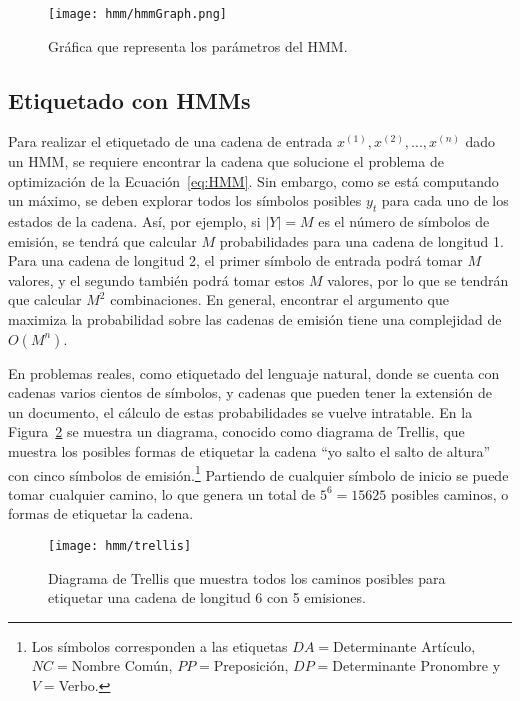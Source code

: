\begin{figure}
 \centering
 \texttt{[image: hmm/hmmGraph.png]}
 \caption{Gráfica que representa los parámetros del HMM.}\label{Fig:hmmGraph}
\end{figure}





\subsection{Etiquetado con HMMs}

Para realizar el etiquetado de una cadena de entrada $x^{(1)}, x^{(2)},...,x^{(n)}$ dado un HMM, se requiere encontrar la cadena que solucione el problema de optimización de la Ecuación~\ref{eq:HMM}. Sin embargo, como se está computando un máximo, se deben explorar todos los símbolos posibles $y_t$ para cada uno de los estados de la cadena. Así, por ejemplo, si $|Y| = M$ es el número de símbolos de emisión, se tendrá que calcular $M$ probabilidades para una cadena de longitud 1. Para una cadena de longitud 2, el primer símbolo de entrada podrá tomar $M$ valores, y el segundo también podrá tomar estos $M$ valores, por lo que se tendrán que calcular $M^2$ combinaciones. En general, encontrar el argumento que maximiza la probabilidad sobre las cadenas de emisión tiene una complejidad de $O(M^n)$.

En problemas reales, como etiquetado del lenguaje natural, donde se cuenta con cadenas varios cientos de símbolos, y cadenas que pueden tener la extensión de un documento, el cálculo de estas probabilidades se vuelve intratable. En la Figura~\ref{Fig:Trellis} se muestra un diagrama, conocido como diagrama de Trellis, que muestra los posibles formas de etiquetar la cadena ``yo salto el salto de altura'' con cinco símbolos de emisión.\footnote{Los símbolos corresponden a las etiquetas $DA=$Determinante Artículo, $NC=$Nombre Común, $PP=$Preposición, $DP=$Determinante Pronombre y $V=$Verbo.} Partiendo de cualquier símbolo de inicio se puede tomar cualquier camino, lo que genera un total de $5^6=15 625$ posibles caminos, o formas de etiquetar la cadena.


\begin{figure}
    \centering
    \texttt{[image: hmm/trellis]}
    \caption{Diagrama de Trellis que muestra todos los caminos posibles para etiquetar una cadena de longitud 6 con 5 emisiones.}
    \label{Fig:Trellis}
\end{figure}

